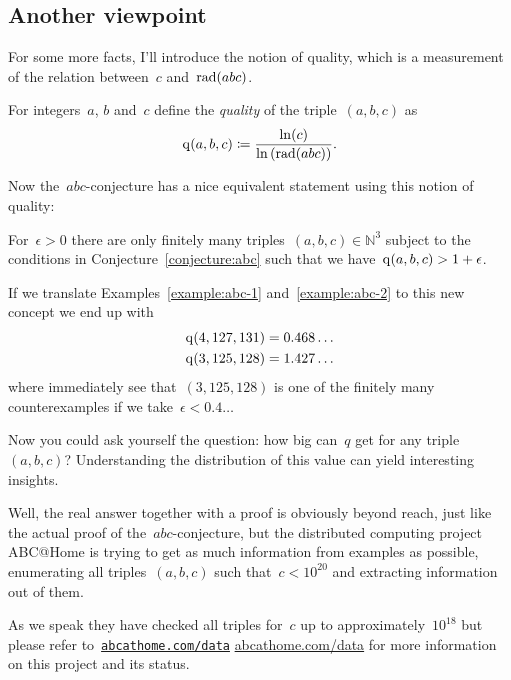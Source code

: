 \subsection{Another viewpoint}

For some more facts, I'll introduce the notion of quality, which is a measurement of the relation between~$c$ and~$\operatorname{rad}(abc)$.

\begin{definition}
  For integers~$a$, $b$ and~$c$ define the \emph{quality} of the triple~$(a,b,c)$ as
  \begin{equation}
    \operatorname{q}(a,b,c)\coloneqq\frac{\ln(c)}{\ln\left( \operatorname{rad}(abc) \right)}.
  \end{equation}
\end{definition}

Now the~$abc$\nobreakdash-conjecture has a nice equivalent statement using this notion of quality:

\begin{conjecture}
  For~$\epsilon>0$ there are only finitely many triples~$(a,b,c)\in\mathbb{N}^3$ subject to the conditions in Conjecture~\ref{conjecture:abc} such that we have~$\operatorname{q}(a,b,c)>1+\epsilon$.
\end{conjecture}

If we translate Examples~\ref{example:abc-1} and~\ref{example:abc-2} to this new concept we end up with
\begin{equation}
  \begin{aligned}
    \operatorname{q}(4,127,131)&=0.468\ldots \\
    \operatorname{q}(3,125,128)&=1.427\ldots
  \end{aligned}
\end{equation}
where immediately see that~$(3,125,128)$ is one of the finitely many counterexamples if we take~$\epsilon<0.4\ldots$

Now you could ask yourself the question: how big can~$q$ get for any triple~$(a,b,c)$? Understanding the distribution of this value can yield interesting insights.

Well, the real answer together with a proof is obviously beyond reach, just like the actual proof of the~$abc$\nobreakdash-conjecture, but  the distributed computing project ABC@Home is trying to get as much information from examples as possible, enumerating all triples~$(a,b,c)$ such that~$c<10^{20}$ and extracting information out of them.

As we speak they have checked all triples for~$c$ up to approximately~$10^{18}$ but please refer to~\iftex\href{http://abcathome.com/data/}{\texttt{abcathome.com/data}} \fi\ifblog\href{http://abcathome.com/data/}{abcathome.com/data} \fi for more information on this project and its status.

